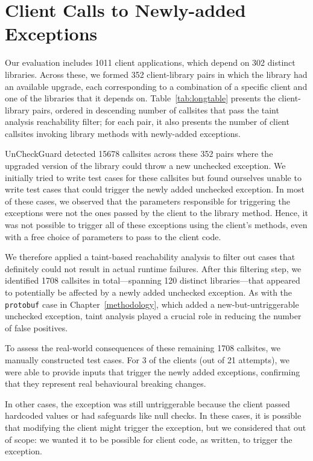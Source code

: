 \section{Client Calls to Newly-added Exceptions}

Our evaluation includes 1011 client applications, which depend on 302 distinct libraries. Across these, we formed 352 client-library pairs in which the library had an available upgrade, each corresponding to a combination of a specific client and one of the libraries that it depends on. Table~\ref{tab:longtable} presents the client-library pairs, ordered in descending number of callsites that pass the taint analysis reachability filter; for each pair, it also presents the number of client callsites invoking library methods with newly-added exceptions.

UnCheckGuard detected 15678 callsites across these 352 pairs where the upgraded version of the library could throw a new unchecked exception.
We initially tried to write test cases for these callsites but found ourselves unable to write test cases that could trigger
the newly added unchecked exception. In most of these cases, we observed that the parameters responsible for triggering the 
exceptions were not the ones passed by the client to the library method.
Hence, it was not possible to trigger all of these exceptions using the client's methods, even with a free choice of parameters to pass to the client code.

We therefore applied a taint-based reachability analysis to filter out cases that definitely could not result in actual runtime failures. After this filtering step, we identified 1708 callsites in total—spanning 120 distinct libraries—that appeared to potentially be affected by a newly added unchecked exception.
As with the \texttt{protobuf} case in Chapter~\ref{methodology}, which added a new-but-untriggerable unchecked exception, taint analysis played a crucial role in reducing the number of false positives.

To assess the real-world consequences of these remaining 1708 callsites, we manually constructed test cases. For 3 of the clients (out of 21 attempts), we were able to provide inputs that trigger the newly added exceptions, confirming that they represent real behavioural breaking changes.

In other cases, the exception was still untriggerable because the client passed hardcoded values or had safeguards like null checks. In these cases, it is possible that modifying the client might trigger the exception, but we considered that out of scope: we wanted it to be possible for client code, as written, to trigger the exception.

